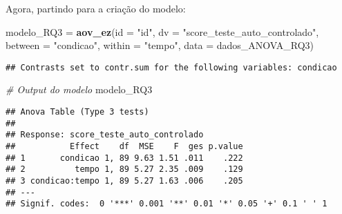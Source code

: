 \documentclass[
]{article}
\newenvironment{Shaded}{\begin{snugshade}}{\end{snugshade}}
\newcommand{\AttributeTok}[1]{\textcolor[rgb]{0.13,0.29,0.53}{#1}}
\newcommand{\CommentTok}[1]{\textcolor[rgb]{0.56,0.35,0.01}{\textit{#1}}}
\newcommand{\FunctionTok}[1]{\textcolor[rgb]{0.13,0.29,0.53}{\textbf{#1}}}
\newcommand{\NormalTok}[1]{#1}
\newcommand{\OtherTok}[1]{\textcolor[rgb]{0.56,0.35,0.01}{#1}}
\newcommand{\SpecialCharTok}[1]{\textcolor[rgb]{0.81,0.36,0.00}{\textbf{#1}}}
\newcommand{\StringTok}[1]{\textcolor[rgb]{0.31,0.60,0.02}{#1}}
\begin{document}
\begin{Shaded}
\end{Shaded}

Agora, partindo para a criação do modelo:

\begin{Shaded}
\begin{Highlighting}[]
\NormalTok{modelo\_RQ3 }\OtherTok{=} \FunctionTok{aov\_ez}\NormalTok{(}\AttributeTok{id =} \StringTok{"id"}\NormalTok{,}
                     \AttributeTok{dv =} \StringTok{"score\_teste\_auto\_controlado"}\NormalTok{,}
                     \AttributeTok{between =} \StringTok{"condicao"}\NormalTok{,}
                     \AttributeTok{within =} \StringTok{"tempo"}\NormalTok{,}
                     \AttributeTok{data =}\NormalTok{ dados\_ANOVA\_RQ3)}
\end{Highlighting}
\end{Shaded}

\begin{verbatim}
## Contrasts set to contr.sum for the following variables: condicao
\end{verbatim}

\begin{Shaded}
\begin{Highlighting}[]
\CommentTok{\# Output do modelo}
\NormalTok{modelo\_RQ3}
\end{Highlighting}
\end{Shaded}

\begin{verbatim}
## Anova Table (Type 3 tests)
## 
## Response: score_teste_auto_controlado
##           Effect    df  MSE    F  ges p.value
## 1       condicao 1, 89 9.63 1.51 .011    .222
## 2          tempo 1, 89 5.27 2.35 .009    .129
## 3 condicao:tempo 1, 89 5.27 1.63 .006    .205
## ---
## Signif. codes:  0 '***' 0.001 '**' 0.01 '*' 0.05 '+' 0.1 ' ' 1
\end{verbatim}
\end{document}
